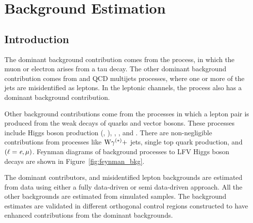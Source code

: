%
%

\chapter{Background Estimation}
\label{bkg_est}

\section{Introduction}
The dominant background contribution comes from the \Ztt process, in which the muon or electron arises from a tau decay. The other dominant background contribution comes from \wjets and QCD multijets processes, where one or more of the jets are misidentified as leptons. In the leptonic channels, the \ttbar process also has a dominant background contribution.

Other background contributions come from the processes in which a lepton pair is produced from the weak decays of quarks and vector bosons. These processes include Higgs boson production (\Htt, \PW{}\PW), \PW{}\PW, \PW{}\PZ, and \PZ{}\PZ. There are non-negligible contributions from processes like $\text{W}\gamma^{(\ast)} +$ jets, single top quark production, and \Zll $(\ell=\textit{e},\mu)$. Feynman diagrams of background processes to LFV Higgs boson decays are shown in Figure~\ref{fig:feynman_bkg}.

The dominant contributors, \Ztt and misidentified lepton backgrounds are estimated from data using either a fully data-driven or semi data-driven approach. All the other backgrounds are estimated from simulated samples. The background estimates are validated in different orthogonal control regions constructed to have enhanced contributions from the dominant backgrounds.

